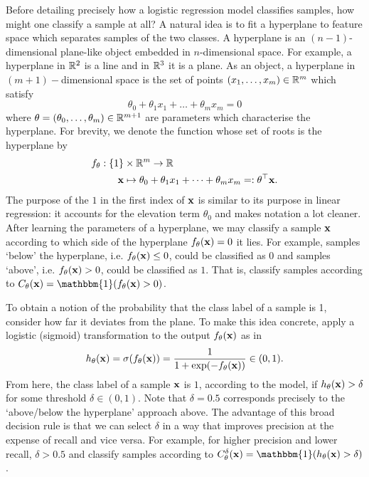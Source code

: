 \documentclass[11pt]{article}
\begin{document}
Before detailing precisely how a logistic regression model classifies samples, how might one classify a sample at all? A natural idea is to fit a hyperplane to feature space which separates samples of the two classes. A hyperplane is an $(n-1)$-dimensional plane-like object embedded in $n$-dimensional space. For example, a hyperplane in $\mathbb{R}^2$ is a line and in $\mathbb{R}^3$ it is a plane. As an object, a hyperplane in $(m+1)-$dimensional space is the set of points $(x_1,\dots,x_m)\in\mathbb{R}^m$ which satisfy %
$$
\theta_0+\theta_1x_1+\dots+\theta_mx_m
=
0
$$
where $\theta=(\theta_0,\dots,\theta_m)\in\mathbb{R}^{m+1}$ are parameters which characterise the hyperplane. For brevity, we denote the function whose set of roots is the hyperplane by
\begin{align*}
    f_{\theta}:\{1\}&\times\mathbb{R}^m\to\mathbb{R}\\
    \mathbf{x}&\mapsto \theta_0+\theta_1x_1+\dots+\theta_mx_m=:\theta^\top \mathbf{x}.
\end{align*}
The purpose of the $1$ in the first index of $\mathbf{x}$ is similar to its purpose in linear regression: it accounts for the elevation term $\theta_0$ and makes notation a lot cleaner. After learning the parameters of a hyperplane, we may classify a sample $\mathbf{x}$ according to which side of the hyperplane $f_{\theta}(\mathbf{x})=0$ it lies. For example, samples `below' the hyperplane, i.e. $f_{\theta}(\mathbf{x})\leq0$, could be classified as $0$ and samples `above', i.e. $f_{\theta}(\mathbf{x})>0$, could be classified as $1$. That is, classify samples according to $C_{\theta}(\x)=\mathbbm{1}(f_{\theta}(\x)>0)$.

To obtain a notion of the probability that the class label of a sample is 1, consider how far it deviates from the plane. To make this idea concrete, apply a logistic (sigmoid) transformation to the output $f_{\theta}(\mathbf{x})$ as in
$$
h_{\theta}(\mathbf{x})
=
\sigma(f_{\theta}(\mathbf{x}))
=
\frac{1}{1+\exp(-f_{\theta}(\mathbf{x}))}\in(0,1).
$$
From here, the class label of a sample $\mathbf{x}$ is $1$, according to the model, if $h_{\theta}(\mathbf{x})>\delta$ for some threshold $\delta\in(0,1)$. Note that $\delta=0.5$ corresponds precisely to the `above/below the hyperplane' approach above. The advantage of this broad decision rule is that we can select $\delta$ in a way that improves precision at the expense of recall and vice versa. For example, for higher precision and lower recall, $\delta>0.5$ and classify samples according to $C_{\theta}^{\delta}(\x)=\mathbbm{1}(h_{\theta}(\x)>\delta)$.
\end{document}
